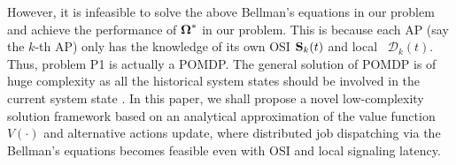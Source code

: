 However, it is infeasible to solve the above Bellman's equations in our problem {and achieve the performance of $\boldsymbol{\Omega}^*$ in our problem.}
This is because each AP (say the $k$-th AP) only has the knowledge of its own OSI $\mathbf{S}_{k}(t)$ and local \brlatency~$\mathcal{D}_{k}(t)$.
Thus, problem P1 is actually a POMDP.
The general solution of POMDP is of huge complexity {as all the historical system states should be involved in the current system state} \cite{IJCAI03-NairR,IJCAI99-BoutilierC}.
In this paper, we shall propose a novel low-complexity solution framework based on an analytical approximation of the value function $V(\cdot)$ and alternative actions update, where distributed job dispatching via the Bellman's equations becomes feasible even with OSI and local signaling latency.
